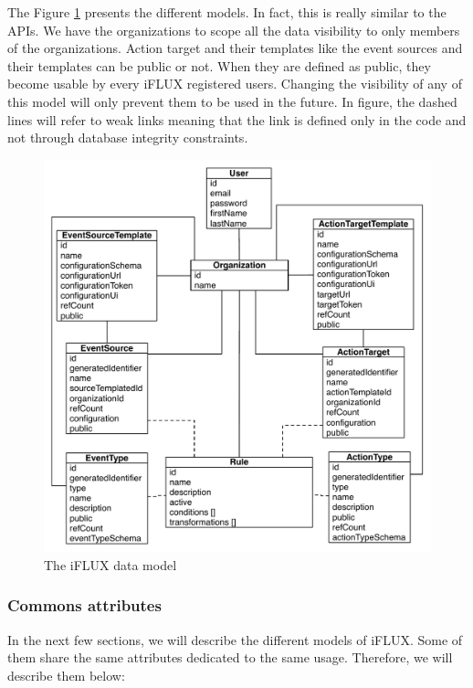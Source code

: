 The Figure \ref{fig:data-model} presents the different models. In fact, this is really similar to the APIs. We have the organizations to scope all the data visibility to only members of the organizations. Action target and their templates like the event sources and their templates can be public or not. When they are defined as public, they become usable by every iFLUX registered users. Changing the visibility of any of this model will only prevent them to be used in the future. In figure, the dashed lines will refer to weak links meaning that the link is defined only in the code and not through database integrity constraints.

\begin{figure}
\centering
\includegraphics[width=1\columnwidth]{figures/data-model.pdf}
\caption{The iFLUX data model}
\label{fig:data-model}
\end{figure}

\subsubsection{Commons attributes}

In the next few sections, we will describe the different models of iFLUX. Some of them share the same attributes dedicated to the same usage. Therefore, we will describe them below:

